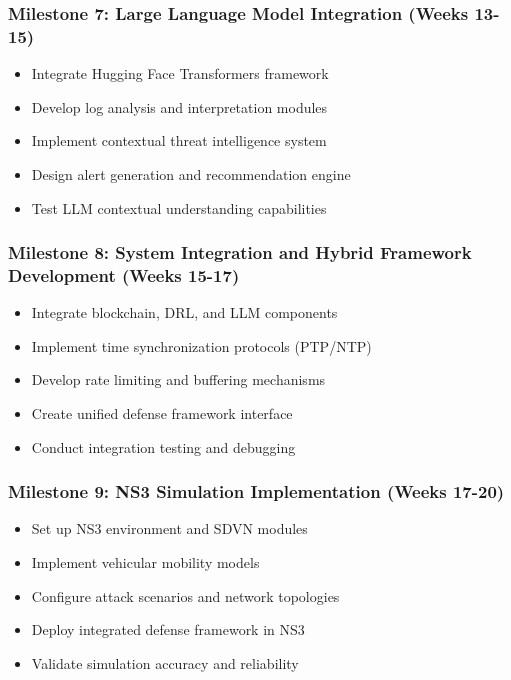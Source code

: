 \subsubsection*{Milestone 7: Large Language Model Integration (Weeks 13-15)}
\begin{itemize}
    \item Integrate Hugging Face Transformers framework
    \item Develop log analysis and interpretation modules
    \item Implement contextual threat intelligence system
    \item Design alert generation and recommendation engine
    \item Test LLM contextual understanding capabilities
\end{itemize}

\subsubsection*{Milestone 8: System Integration and Hybrid Framework Development (Weeks 15-17)}
\begin{itemize}
    \item Integrate blockchain, DRL, and LLM components
    \item Implement time synchronization protocols (PTP/NTP)
    \item Develop rate limiting and buffering mechanisms
    \item Create unified defense framework interface
    \item Conduct integration testing and debugging
\end{itemize}

\subsubsection*{Milestone 9: NS3 Simulation Implementation (Weeks 17-20)}
\begin{itemize}
    \item Set up NS3 environment and SDVN modules
    \item Implement vehicular mobility models
    \item Configure attack scenarios and network topologies
    \item Deploy integrated defense framework in NS3
    \item Validate simulation accuracy and reliability
\end{itemize}

